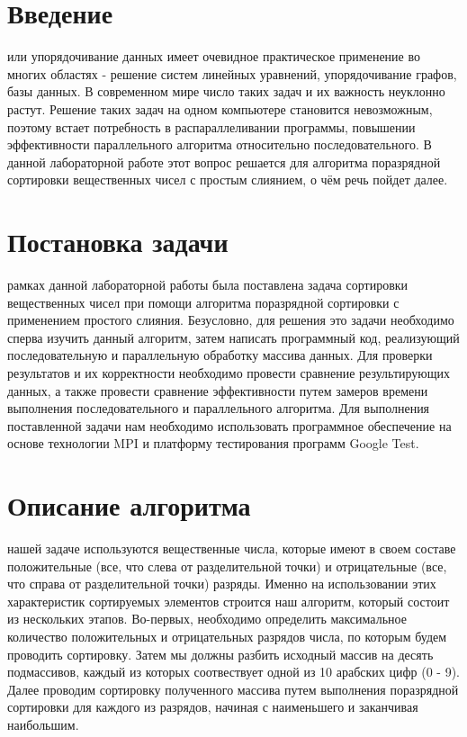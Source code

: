 \documentclass[12pt]{report}
\begin{document}
\setcounter{page}{2}

\tableofcontents

\newpage

\section*{Введение}
 или упорядочивание данных имеет очевидное практическое применение во многих областях - решение систем линейных уравнений, упорядочивание графов, базы данных. В современном мире число таких задач и их важность неуклонно растут. Решение таких задач на одном компьютере становится невозможным, поэтому встает потребность в распараллеливании программы, повышении эффективности параллельного алгоритма относительно последовательного. В данной лабораторной работе этот вопрос решается для алгоритма поразрядной сортировки вещественных чисел с простым слиянием, о чём речь пойдет далее.  

\newpage


\section*{Постановка задачи}
 рамках данной лабораторной работы была поставлена задача сортировки вещественных чисел при помощи алгоритма поразрядной сортировки с применением простого слияния. Безусловно, для решения это задачи необходимо сперва изучить данный алгоритм, затем написать программный код, реализующий последовательную и параллельную обработку массива данных. Для проверки результатов и их корректности необходимо провести сравнение результирующих данных, а также провести сравнение эффективности путем замеров времени выполнения последовательного и параллельного алгоритма. Для выполнения поставленной задачи нам необходимо использовать программное обеспечение на основе технологии MPI и платформу тестирования программ Google Test.

\newpage


\section*{Описание алгоритма}
 нашей задаче используются вещественные числа, которые имеют в своем составе положительные (все, что слева от разделительной точки) и отрицательные (все, что справа от разделительной точки) разряды. Именно на использовании этих характеристик сортируемых элементов строится наш алгоритм, который состоит из нескольких этапов. Во-первых, необходимо определить максимальное количество положительных и отрицательных разрядов числа, по которым будем проводить сортировку. Затем мы должны разбить исходный массив на десять подмассивов, каждый из которых соотвествует одной из 10 арабских цифр (0 - 9). Далее проводим сортировку полученного массива путем выполнения поразрядной сортировки для каждого из разрядов, начиная с наименьшего и заканчивая наибольшим.
\end{document}
